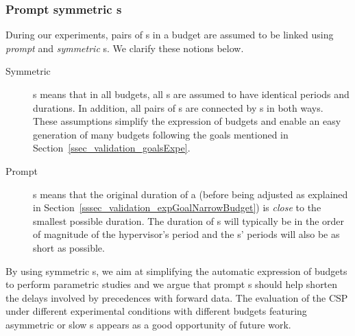 \documentclass[main.tex]{subfiles}
\begin{document}
\subsubsection{Prompt symmetric \PC{}s}
During our experiments, pairs of \PN{}s in a budget are assumed to be linked
using \emph{prompt} and \emph{symmetric} \PC{}s. We clarify these notions
below.
\begin{description}
    \item[Symmetric] \PC{}s means that in all budgets, all \PC{}s are assumed
        to have identical periods and durations. In addition, all pairs of
        \PN{}s are connected by \PC{}s in both ways. These assumptions simplify
        the expression of budgets and enable an easy generation of many budgets
        following the goals mentioned in
        Section~\ref{ssec_validation_goalsExpe}.
    \item[Prompt ] \PC{}s means that the original duration of a \PC{} (before
        being adjusted as explained in
        Section~\ref{sssec_validation_expGoalNarrowBudget}) is \emph{close} to
        the smallest possible \PC{} duration. The duration of \PC{}s will
        typically be in the order of magnitude of the hypervisor's period and
        the \PC{}s' periods will also be as short as possible.
\end{description}

By using symmetric \PC{}s, we aim at simplifying the automatic expression of
budgets to perform parametric studies and we argue that prompt \PC{}s should
help shorten the delays involved by precedences with forward data. The
evaluation of the CSP under different experimental conditions with different
budgets featuring asymmetric or slow \PC{}s appears as a good opportunity of
future work.
\end{document}
